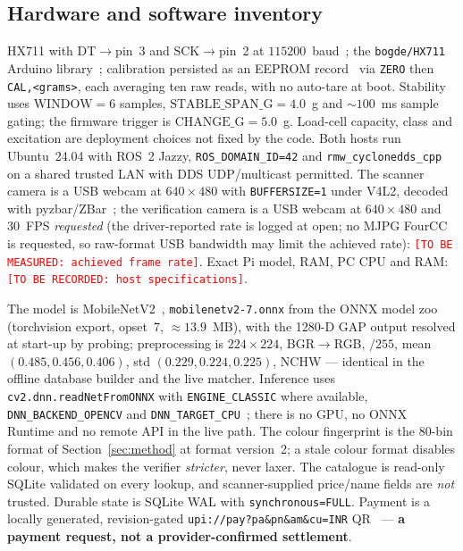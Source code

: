 \documentclass[conference]{IEEEtran}
\newcommand{\tbm}[1]{\textcolor{red}{\texttt{[TO BE MEASURED: #1]}}}
\newcommand{\tbr}[1]{\textcolor{red}{\texttt{[TO BE RECORDED: #1]}}}
\begin{document}
\subsection{Hardware and software inventory}
HX711 with DT$\rightarrow$pin~3 and SCK$\rightarrow$pin~2 at $115200$~baud~\cite{R74}; the
\texttt{bogde/HX711} Arduino library~\cite{R75}; calibration persisted as an EEPROM
record~\cite{R79} via \texttt{ZERO} then \texttt{CAL,<grams>}, each averaging ten raw reads, with no
auto-tare at boot. Stability uses $\mathrm{WINDOW}{=}6$ samples,
$\mathrm{STABLE\_SPAN\_G}{=}4.0$~g and ${\sim}100$~ms sample gating; the firmware trigger is
$\mathrm{CHANGE\_G}{=}5.0$~g. Load-cell capacity, class and excitation are deployment choices not
fixed by the code. Both hosts run Ubuntu~24.04 with ROS~2 Jazzy,
\texttt{ROS\_DOMAIN\_ID=42} and \texttt{rmw\_cyclonedds\_cpp} on a shared trusted LAN with DDS
UDP/multicast permitted. The scanner camera is a USB webcam at $640\times480$ with
\texttt{BUFFERSIZE=1} under V4L2, decoded with pyzbar/ZBar~\cite{R78}; the verification camera is a
USB webcam at $640\times480$ and $30$~FPS \emph{requested} (the driver-reported rate is logged at
open; no MJPG FourCC is requested, so raw-format USB bandwidth may limit the achieved rate):
\tbm{achieved frame rate}. Exact Pi model, RAM, PC CPU and RAM: \tbr{host specifications}.

The model is MobileNetV2~\cite{R31}, \texttt{mobilenetv2-7.onnx} from the ONNX model zoo
(torchvision export, opset~7, ${\approx}13.9$~MB), with the 1280-D GAP output resolved at start-up by
probing; preprocessing is $224\times224$, BGR$\rightarrow$RGB, $/255$, mean $(0.485,0.456,0.406)$,
std $(0.229,0.224,0.225)$, NCHW --- identical in the offline database builder and the live matcher.
Inference uses \texttt{cv2.dnn.readNetFromONNX} with \texttt{ENGINE\_CLASSIC} where available,
\texttt{DNN\_BACKEND\_OPENCV} and \texttt{DNN\_TARGET\_CPU}~\cite{R77}; there is no GPU, no ONNX
Runtime and no remote API in the live path. The colour fingerprint is the 80-bin format of
Section~\ref{sec:method} at format version~2; a stale colour format disables colour, which makes the
verifier \emph{stricter}, never laxer. The catalogue is read-only SQLite validated on every lookup,
and scanner-supplied price/name fields are \emph{not} trusted. Durable state is SQLite WAL with
\texttt{synchronous=FULL}. Payment is a locally generated, revision-gated
\texttt{upi://pay?pa\&pn\&am\&cu=INR} QR~\cite{R80} --- \textbf{a payment request, not a
provider-confirmed settlement}.
\end{document}
